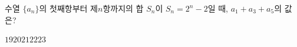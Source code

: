 수열 $\{a_n\}$의 첫째항부터 제$n$항까지의 합 $S_n$이 $S_n=2^n-2$일 때, $a_1+a_3+a_5$의 값은?
\begin{choices32}{$19$}{$20$}{$21$}{$22$}{$23$}\end{choices32}
